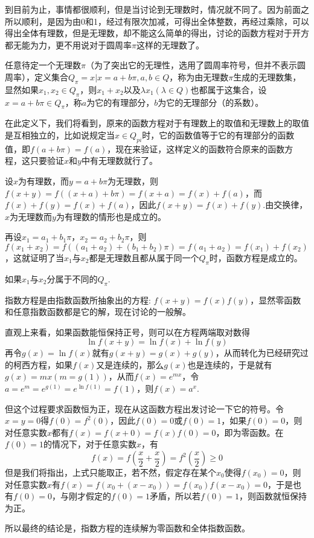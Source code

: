 到目前为止，事情都很顺利，但是当讨论到无理数时，情况就不同了。因为前面之所以顺利，是因为由0和1，经过有限次加减，可得出全体整数，再经过乘除，可以得出全体有理数，但是无理数，却不能这么简单的得出，讨论的函数方程对于开方都无能为力，更不用说对于圆周率$\pi$这样的无理数了。

任意待定一个无理数$\pi$（为了突出它的无理性，选用了圆周率符号，但并不表示圆周率），定义集合$Q_{\pi}={x|x=a+b\pi,a,b\in Q}$，称为由无理数$\pi$生成的无理数集，显然如果$x_1,x_2 \in Q_{\pi}$，则$x_1+x_2$以及$\lambda x_1 (\lambda \in Q)$也都属于这集合，设$x=a+b\pi \in Q_{\pi}$，称$a$为它的有理部分，$b$为它的无理部分（的系数）。

在此定义下，我们将看到，原来的函数方程对于有理数上的取值和无理数上的取值是互相独立的，比如说规定当$x \in Q_{pi}$时，它的函数值等于它的有理部分的函数值，即$f(a+b\pi)=f(a)$，现在来验证，这样定义的函数符合原来的函数方程，这只要验证$x$和$y$中有无理数就行了。

设$x$为有理数，而$y=a+b\pi$为无理数，则$f(x+y)=f((x+a)+b\pi)=f(x+a)=f(x)+f(a)$，而$f(x)+f(y)=f(x)+f(a)$，因此$f(x+y)=f(x)+f(y)$.由交换律，$x$为无理数而$y$为有理数的情形也是成立的。

再设$x_1=a_1+b_1\pi$，$x_2=a_2+b_2\pi$，则$f(x_1+x_2)=f((a_1+a_2)+(b_1+b_2)\pi)=f(a_1+a_2)=f(x_1)+f(x_2)$，这就证明了当$x_1$与$x_2$都是无理数且都从属于同一个$Q_{\pi}$时，函数方程是成立的。

如果$x_1$与$x_2$分属于不同的$Q_{\pi}$.

指数方程是由指数函数所抽象出的方程: $f(x+y)=f(x)f(y)$，显然零函数和任意指数函数都是它的解，现在讨论的一般解。

直观上来看，如果函数能恒保持正号，则可以在方程两端取对数得
\[ \ln{f(x+y)} = \ln{f(x)} + \ln{f(y)} \]
再令$g(x)=\ln{f(x)}$就有$g(x+y)=g(x)+g(y)$，从而转化为已经研究过的柯西方程，如果$f(x)$又是连续的，那么$g(x)$也是连续的，于是就有$g(x)=mx(m=g(1))$，从而$f(x)=e^{mx}$，令$a=e^m=e^{g(1)}=e^{\ln{f(1)}}=f(1)$，则$f(x)=a^x$.

但这个过程要求函数恒为正，现在从这函数方程出发讨论一下它的符号。令$x=y=0$得$f(0)=f^2(0)$，因此$f(0)=0$或$f(0)=1$，如果$f(0)=0$，则对任意实数$x$都有$f(x)=f(x+0)=f(x)f(0)=0$，即为零函数。在$f(0)=1$的情况下，对于任意实数$x$，有
\[ f(x) = f\left( \frac{x}{2} + \frac{x}{2} \right) = f^2 \left( \frac{x}{2} \right) \geqslant 0 \]
但是我们将指出，上式只能取正，若不然，假定存在某个$x_0$使得$f(x_0)=0$，则对任意实数$x$有$f(x)=f(x_0+(x-x_0))=f(x_0)f(x-x_0)=0$，于是也有$f(0)=0$，与刚才假定的$f(0)=1$矛盾，所以若$f(0)=1$，则函数就恒保持为正。

所以最终的结论是，指数方程的连续解为零函数和全体指数函数。

